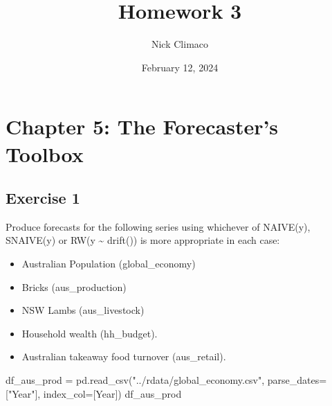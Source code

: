 \documentclass[
  11pt,
]{article}
\title{Homework 3}
\author{Nick Climaco}
\date{February 12, 2024}
\newenvironment{Shaded}{\begin{snugshade}}{\end{snugshade}}
\newcommand{\NormalTok}[1]{\textcolor[rgb]{0.00,0.23,0.31}{#1}}
\newcommand{\OperatorTok}[1]{\textcolor[rgb]{0.37,0.37,0.37}{#1}}
\newcommand{\StringTok}[1]{\textcolor[rgb]{0.13,0.47,0.30}{#1}}
\renewcommand*\contentsname{Table of contents}
\newcommand\contentsname{Table of contents}
\begin{document}
\maketitle


\renewcommand*\contentsname{Table of contents}
{
\hypersetup{linkcolor=}
\setcounter{tocdepth}{3}
\tableofcontents
}
\newpage

\section{Chapter 5: The Forecaster's
Toolbox}\label{chapter-5-the-forecasters-toolbox}

\subsection{Exercise 1}\label{exercise-1}

Produce forecasts for the following series using whichever of NAIVE(y),
SNAIVE(y) or RW(y \textasciitilde{} drift()) is more appropriate in each
case:

\begin{itemize}
\item
  Australian Population (global\_economy)
\item
  Bricks (aus\_production)
\item
  NSW Lambs (aus\_livestock)
\item
  Household wealth (hh\_budget).
\item
  Australian takeaway food turnover (aus\_retail).
\end{itemize}

\begin{Shaded}
\begin{Highlighting}[]
\NormalTok{df\_aus\_prod }\OperatorTok{=}\NormalTok{ pd.read\_csv(}\StringTok{"../rdata/global\_economy.csv"}\NormalTok{, parse\_dates}\OperatorTok{=}\NormalTok{[}\StringTok{"Year"}\NormalTok{], index\_col}\OperatorTok{=}\NormalTok{[}\StringTok{\textquotesingle{}Year\textquotesingle{}}\NormalTok{])}
\NormalTok{df\_aus\_prod}
\end{Highlighting}
\end{Shaded}
\end{document}
